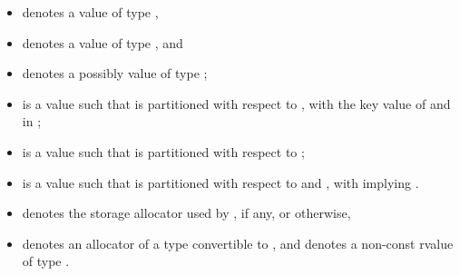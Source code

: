 \begin{itemize}
 designates an object of type ,
\item
{} denotes a value of type ,
\item
{} denotes a value of type , and
\item
{} denotes a possibly  value of type ;
\item
{} is a value such that  is partitioned
with respect to , with  the key value of 
and  in ;
\item
{} is a value such that  is partitioned with respect to
;
\item
{} is a value such that  is partitioned with respect to
 and , with  implying
.
\item
{} denotes the storage allocator used by , if any, or  otherwise,
\item
{} denotes an allocator of a type convertible to ,
and  denotes a non-const rvalue of type .
\end{itemize}

\newcommand{\indexordmem}[1]{%
\indexlibrary{\idxcode{#1}!ordered associative containers}%
\indexlibrary{\idxcode{set}!\idxcode{#1}}%
\indexlibrary{\idxcode{map}!\idxcode{#1}}%
\indexlibrary{\idxcode{multiset}!\idxcode{#1}}%
\indexlibrary{\idxcode{multimap}!\idxcode{#1}}%
}

